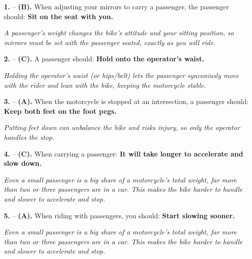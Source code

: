 \begin{minipage}{\linewidth}
\noindent\textbf{1.}  -- \textbf {(B).} When adjusting your mirrors to carry a passenger, the passenger should:  \textbf {Sit on the seat with you.} \par \textit {A passenger's weight changes the bike's attitude and your sitting position, so mirrors must be set with the passenger seated, exactly as you will ride.} \\
\end{minipage}

\begin{minipage}{\linewidth}
\noindent\textbf{2.}  -- \textbf {(C).} A passenger should:  \textbf {Hold onto the operator's waist.} \par \textit {Holding the operator's waist (or hips/belt) lets the passenger synconiusly move with the rider and lean with the bike, keeping the motorcycle stable.} \\
\end{minipage}

\begin{minipage}{\linewidth}
\noindent\textbf{3.}  -- \textbf {(A).} When the motorcycle is stopped at an intersection, a passenger should:  \textbf {Keep both feet on the foot pegs.} \par \textit {Putting feet down can unbalance the bike and risks injury, so only the operator handles the stop.} \\
\end{minipage}

\begin{minipage}{\linewidth}
\noindent\textbf{4.}  -- \textbf {(C).} When carrying a passenger:  \textbf {It will take longer to accelerate and slow down.} \par \textit {Even a small passenger is a big share of a motorcycle's total weight, far more than two or three passengers are in a car. This makes the bike harder to handle and slower to accelerate and stop.} \\
\end{minipage}

\begin{minipage}{\linewidth}
\noindent\textbf{5.}  -- \textbf {(A).} When riding with passengers, you should:  \textbf {Start slowing sooner.} \par \textit {Even a small passenger is a big share of a motorcycle's total weight, far more than two or three passengers are in a car. This makes the bike harder to handle and slower to accelerate and stop.} \\
\end{minipage}

